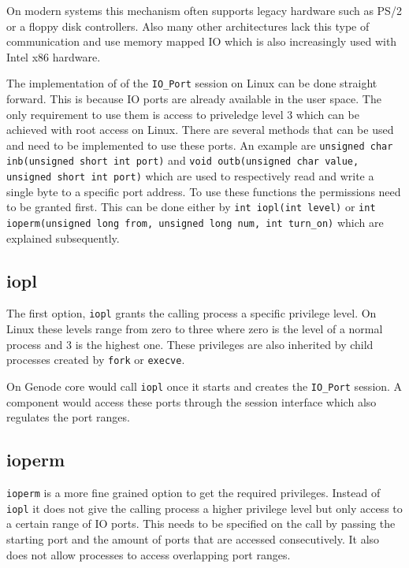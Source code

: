 \documentclass[
a4paper,
12pt,
notitlepage,
parskip=half,
DIV=11,
]{scrbook}
\begin{document}
		On modern systems this mechanism often supports legacy hardware such as PS/2 or a floppy disk controllers.
		Also many other architectures lack this type of communication and use memory mapped IO which is also increasingly used with Intel x86 hardware.
		\citep{ioports} \citep{intelmanual}
		
		The implementation of of the \texttt{IO\_Port} session on Linux can be done straight forward.
		This is because IO ports are already available in the user space.
		The only requirement to use them is access to priveledge level 3 which can be achieved with root access on Linux.
		There are several methods that can be used and need to be implemented to use these ports.
		An example are \texttt{unsigned char inb(unsigned short int port)} and \texttt{void outb(unsigned char value, unsigned short int port)} which are used to respectively read and write a single byte to a specific port address.
		To use these functions the permissions need to be granted first.
		This can be done either by \texttt{int iopl(int level)} or \texttt{int ioperm(unsigned long from, unsigned long num, int turn\_on)} which are explained subsequently. \citep{outb} \citep{ioperm} \citep{iopl}
				
		\subsection{iopl}
		
		The first option, \texttt{iopl} grants the calling process a specific privilege level.
		On Linux these levels range from zero to three where zero is the level of a normal process and 3 is the highest one.
		These privileges are also inherited by child processes created by \texttt{fork} or \texttt{execve}. \citep{iopl}
		
		On Genode core would call \texttt{iopl} once it starts and creates the \texttt{IO\_Port} session.
		A component would access these ports through the session interface which also regulates the port ranges.
		
		\subsection{ioperm}
		
		\texttt{ioperm} is a more fine grained option to get the required privileges.
		Instead of \texttt{iopl} it does not give the calling process a higher privilege level but only access to a certain range of IO ports.
		This needs to be specified on the call by passing the starting port and the amount of ports that are accessed consecutively.
		It also does not allow processes to access overlapping port ranges. \citep{ioperm}
		
\end{document}
